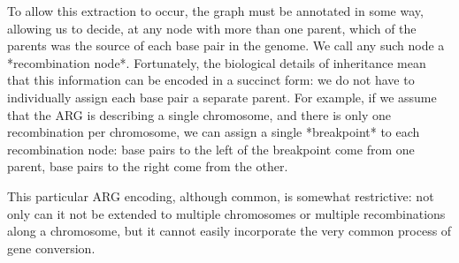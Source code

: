 \documentclass{article}
\begin{document}
To allow this extraction to occur, the graph must be annotated in some way, allowing us to
decide, at any node with more than one parent, which of the parents was the source of
each base pair in the genome. We call any such node a *recombination node*. Fortunately,
the biological details of inheritance mean that this information can be encoded in a succinct
form: we do not have to individually assign each base pair a separate parent. For example,
if we assume that the ARG is describing a single chromosome, and there is only one
recombination per chromosome, we can assign a single *breakpoint* to each recombination
node: base pairs to the left of the breakpoint come from one parent, base pairs to the right
come from the other.

This particular ARG encoding, although common, is somewhat restrictive: not only can
it not be extended to multiple chromosomes or multiple recombinations along a chromosome,
but it cannot easily incorporate the very common process of gene conversion.





\end{document}
